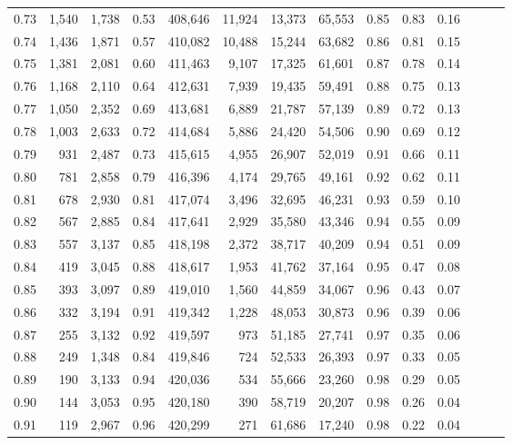 \begin{tabular}{rrrrrrrrrrrrrr}
0.73 &  1,540 &  1,738 &  0.53 &  408,646 &   11,924 &  13,373 &  65,553 &  0.85 &  0.83 &      0.16 \\
0.74 &  1,436 &  1,871 &  0.57 &  410,082 &   10,488 &  15,244 &  63,682 &  0.86 &  0.81 &      0.15 \\
0.75 &  1,381 &  2,081 &  0.60 &  411,463 &    9,107 &  17,325 &  61,601 &  0.87 &  0.78 &      0.14 \\
0.76 &  1,168 &  2,110 &  0.64 &  412,631 &    7,939 &  19,435 &  59,491 &  0.88 &  0.75 &      0.13 \\
0.77 &  1,050 &  2,352 &  0.69 &  413,681 &    6,889 &  21,787 &  57,139 &  0.89 &  0.72 &      0.13 \\
0.78 &  1,003 &  2,633 &  0.72 &  414,684 &    5,886 &  24,420 &  54,506 &  0.90 &  0.69 &      0.12 \\
0.79 &    931 &  2,487 &  0.73 &  415,615 &    4,955 &  26,907 &  52,019 &  0.91 &  0.66 &      0.11 \\
0.80 &    781 &  2,858 &  0.79 &  416,396 &    4,174 &  29,765 &  49,161 &  0.92 &  0.62 &      0.11 \\
0.81 &    678 &  2,930 &  0.81 &  417,074 &    3,496 &  32,695 &  46,231 &  0.93 &  0.59 &      0.10 \\
0.82 &    567 &  2,885 &  0.84 &  417,641 &    2,929 &  35,580 &  43,346 &  0.94 &  0.55 &      0.09 \\
0.83 &    557 &  3,137 &  0.85 &  418,198 &    2,372 &  38,717 &  40,209 &  0.94 &  0.51 &      0.09 \\
0.84 &    419 &  3,045 &  0.88 &  418,617 &    1,953 &  41,762 &  37,164 &  0.95 &  0.47 &      0.08 \\
0.85 &    393 &  3,097 &  0.89 &  419,010 &    1,560 &  44,859 &  34,067 &  0.96 &  0.43 &      0.07 \\
0.86 &    332 &  3,194 &  0.91 &  419,342 &    1,228 &  48,053 &  30,873 &  0.96 &  0.39 &      0.06 \\
0.87 &    255 &  3,132 &  0.92 &  419,597 &      973 &  51,185 &  27,741 &  0.97 &  0.35 &      0.06 \\
0.88 &    249 &  1,348 &  0.84 &  419,846 &      724 &  52,533 &  26,393 &  0.97 &  0.33 &      0.05 \\
0.89 &    190 &  3,133 &  0.94 &  420,036 &      534 &  55,666 &  23,260 &  0.98 &  0.29 &      0.05 \\
0.90 &    144 &  3,053 &  0.95 &  420,180 &      390 &  58,719 &  20,207 &  0.98 &  0.26 &      0.04 \\
0.91 &    119 &  2,967 &  0.96 &  420,299 &      271 &  61,686 &  17,240 &  0.98 &  0.22 &      0.04 \\

\end{tabular}
